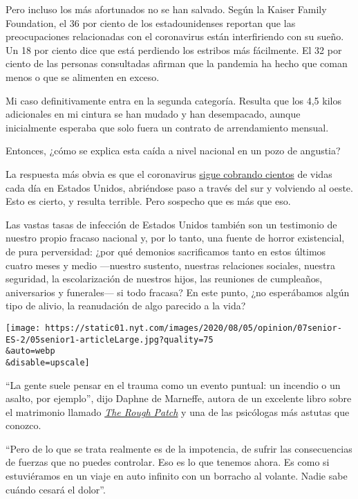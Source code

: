 Pero incluso los más afortunados no se han salvado. Según la Kaiser
Family Foundation, el 36 por ciento de los estadounidenses reportan que
las preocupaciones relacionadas con el coronavirus están interfiriendo
con su sueño. Un 18 por ciento dice que está perdiendo los estribos más
fácilmente. El 32 por ciento de las personas consultadas afirman que la
pandemia ha hecho que coman menos o que se alimenten en exceso.

Mi caso definitivamente entra en la segunda categoría. Resulta que los
4,5 kilos adicionales en mi cintura se han mudado y han desempacado,
aunque inicialmente esperaba que solo fuera un contrato de arrendamiento
mensual.

Entonces, ¿cómo se explica esta caída a nivel nacional en un pozo de
angustia?

La respuesta más obvia es que el coronavirus
\href{https://www.nytimes.com/es/interactive/2020/espanol/mundo/coronavirus-en-estados-unidos.html}{sigue
cobrando cientos} de vidas cada día en Estados Unidos, abriéndose paso a
través del sur y volviendo al oeste. Esto es cierto, y resulta terrible.
Pero sospecho que es más que eso.

Las vastas tasas de infección de Estados Unidos también son un
testimonio de nuestro propio fracaso nacional y, por lo tanto, una
fuente de horror existencial, de pura perversidad: ¿por qué demonios
sacrificamos tanto en estos últimos cuatro meses y medio ---nuestro
sustento, nuestras relaciones sociales, nuestra seguridad, la
escolarización de nuestros hijos, las reuniones de cumpleaños,
aniversarios y funerales--- si todo fracasa? En este punto, ¿no
esperábamos algún tipo de alivio, la reanudación de algo parecido a la
vida?

\texttt{[image: https://static01.nyt.com/images/2020/08/05/opinion/07senior-ES-2/05senior1-articleLarge.jpg?quality=75\\\&auto=webp\\\&disable=upscale]}

``La gente suele pensar en el trauma como un evento puntual: un incendio
o un asalto, por ejemplo'', dijo Daphne de Marneffe, autora de un
excelente libro sobre el matrimonio llamado
\href{https://www.thecut.com/2018/01/daphne-de-marneff-on-the-rough-patch.html}{\emph{The
Rough Patch}} y una de las psicólogas más astutas que conozco.

``Pero de lo que se trata realmente es de la impotencia, de sufrir las
consecuencias de fuerzas que no puedes controlar. Eso es lo que tenemos
ahora. Es como si estuviéramos en un viaje en auto infinito con un
borracho al volante. Nadie sabe cuándo cesará el dolor''.

